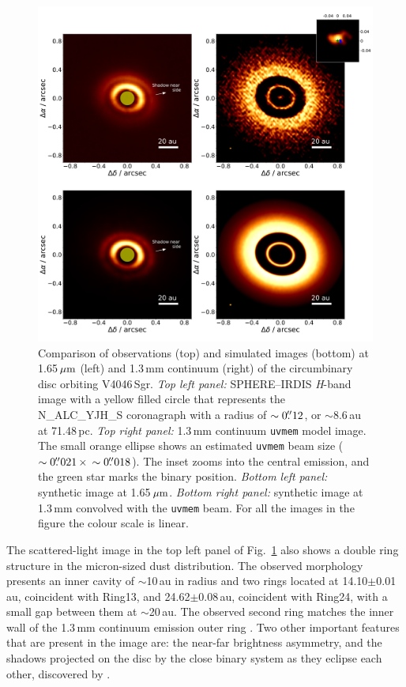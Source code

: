 \documentclass[fleqn,usenatbib,useAMS]{mnras}
\begin{document}
\begin{figure}
  \includegraphics[width=\textwidth]{hot_two_E.pdf}
  \caption{Comparison of observations (top) and simulated images (bottom) at 1.65\,$\hbox{$\mu$m}$ (left) and 1.3\,mm continuum (right) of the circumbinary disc orbiting V4046\,Sgr. \textit{Top left panel:} SPHERE--IRDIS \textit{H}-band image with a yellow filled circle that represents the N\_ALC\_YJH\_S coronagraph with a radius of $\sim0\hbox{$.\!\!^{\prime\prime}$}12$, or $\sim$8.6\,au at 71.48\,pc. \textit{Top right panel:} 1.3\,mm continuum {\tt uvmem} model image. The small orange ellipse shows an estimated {\tt uvmem} beam size ($\sim0\hbox{$.\!\!^{\prime\prime}$}021 \, \times \, \sim0\hbox{$.\!\!^{\prime\prime}$}018$). The inset zooms into the central emission, and the green star marks the binary position. \textit{Bottom left panel:} synthetic image at 1.65\,$\hbox{$\mu$m}$. \textit{Bottom right panel:} synthetic image at 1.3\,mm convolved with the {\tt uvmem} beam. For all the images in the figure the colour scale is linear.}
  \label{fig:images_vs_simulated}
\end{figure}

The scattered-light image in the top left panel of Fig.~\ref{fig:images_vs_simulated} also shows a double ring structure in the micron-sized dust distribution. The observed morphology presents an inner cavity of $\sim$10\,au in radius and two rings located at 14.10$\pm$0.01\,au, coincident with Ring13, and 24.62$\pm$0.08\,au, coincident with Ring24, with a small gap between them at $\sim$20\,au. The observed second ring matches the inner wall of the 1.3\,mm continuum emission outer ring \citep{Ru_z_Rodr_guez_2019}. Two other important features that are present in the image are: the near-far brightness asymmetry, and the shadows projected on the disc by the close binary system as they eclipse each other, discovered by \citet{dOrazi}.
\end{document}
